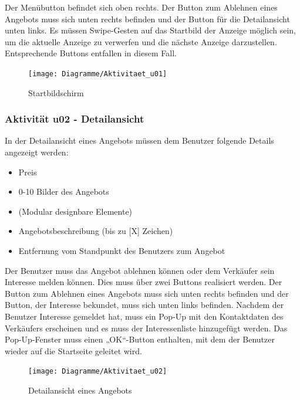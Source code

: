 \documentclass[a4paper,12pt,oneside]{scrartcl}
\begin{document}
Der Menübutton befindet sich oben rechts.
Der Button zum Ablehnen eines Angebots muss sich unten rechts befinden und der Button für die Detailansicht unten links.
Es müssen Swipe-Gesten auf das Startbild der Anzeige möglich sein, um die aktuelle Anzeige zu verwerfen und die nächste Anzeige darzustellen.
Entsprechende Buttons entfallen in diesem Fall.

\begin{figure}[!htbp]
\centering
\noindent\texttt{[image: Diagramme/Aktivitaet\_u01]}
\caption{Startbildschirm}
\end{figure}
\FloatBarrier


\hypertarget{u02}{\subsubsection{Aktivität u02 - Detailansicht}}
In der Detailansicht eines Angebots müssen dem Benutzer folgende Details angezeigt werden:
\begin{itemize}
	\item Preis
	\item 0-10 Bilder des Angebots
	\item (Modular designbare Elemente)
	\item Angebotsbeschreibung (bis zu [X] Zeichen)
	\item Entfernung vom Standpunkt des Benutzers zum Angebot
\end{itemize}
Der Benutzer muss das Angebot ablehnen können oder dem Verkäufer sein Interesse melden können.
Dies muss über zwei Buttons realisiert werden.
Der Button zum Ablehnen eines Angebots muss sich unten rechts befinden und der Button, der Interesse bekundet, muss sich unten links befinden.
Nachdem der Benutzer Interesse gemeldet hat, muss ein Pop-Up mit den Kontaktdaten des Verkäufers  erscheinen und es muss der Interessenliste hinzugefügt werden.
Das Pop-Up-Fenster muss einen „OK“-Button enthalten, mit dem der Benutzer wieder auf die Startseite geleitet wird.

\begin{figure}[!htbp]
\centering
\noindent\texttt{[image: Diagramme/Aktivitaet\_u02]}
\caption{Detailansicht eines Angebots}
\end{figure}
\FloatBarrier
\end{document}
